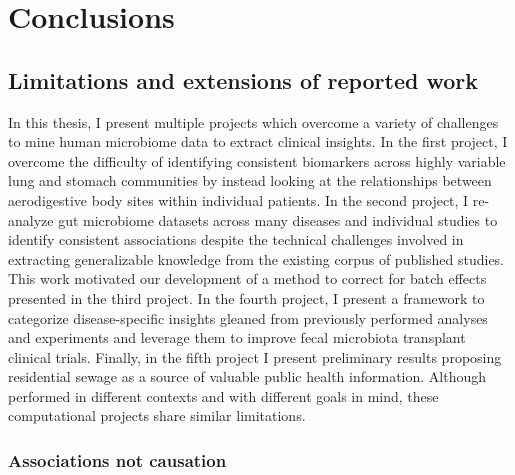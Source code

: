 
\chapter{Conclusions}

\section{Limitations and extensions of reported work}

In this thesis, I present multiple projects which overcome a variety of challenges to mine human microbiome data to extract clinical insights.
In the first project, I overcome the difficulty of identifying consistent biomarkers across highly variable lung and stomach communities by instead looking at the relationships between aerodigestive body sites within individual patients.
In the second project, I re-analyze gut microbiome datasets across many diseases and individual studies to identify consistent associations despite the technical challenges involved in extracting generalizable knowledge from the existing corpus of published studies.
This work motivated our development of a method to correct for batch effects presented in the third project.
In the fourth project, I present a framework to categorize disease-specific insights gleaned from previously performed analyses and experiments and leverage them to improve fecal microbiota transplant clinical trials.
Finally, in the fifth project I present preliminary results proposing residential sewage as a source of valuable public health information.
Although performed in different contexts and with different goals in mind, these computational projects share similar limitations.

\subsection{Associations not causation}

